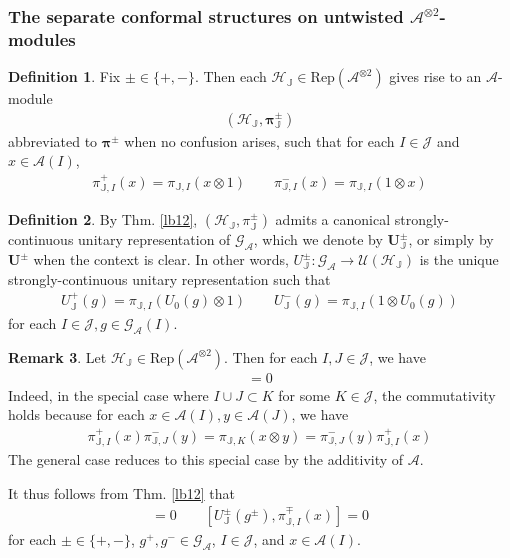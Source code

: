 \documentclass[11pt,b5paper,notitlepage]{article}
\theoremstyle{definition}
\newtheorem{df}{Definition}[section]
\newtheorem{rem}[df]{Remark}
\theoremstyle{plain}
\newcommand{\Rep}{\mathrm{Rep}}
\newcommand{\GA}{\mathscr G_{\mathcal A}}
\newcommand{\Jbb}{\mathbb J}
\newcommand{\MA}{\mathcal A}
\newcommand{\MH}{\mathcal H}
\newcommand{\MJ}{\mathcal J}
\newcommand{\MU}{\mathcal U}
\newcommand{\Maa}{{\mathcal A^{\otimes 2}}}
\newcommand{\hqed}{\hfill\qedsymbol}
\numberwithin{equation}{section}
\begin{document}
\subsubsection{The separate conformal structures on untwisted $\Maa$-modules}

\begin{df}\label{lb83}
Fix $\pm\in\{+,-\}$. Then each $\MH_\Jbb\in\Rep(\Maa)$ gives rise to an $\MA$-module
\begin{align*}
(\MH_\Jbb,\pmb{\pi^\pm_\Jbb})
\end{align*}
abbreviated to $\pmb{\pi^\pm}$ when no confusion arises, such that for each $I\in\MJ$ and $x\in\MA(I)$,
\begin{align*}
\pi_{\Jbb,I}^+(x)=\pi_{\Jbb,I}(x\otimes 1)\qquad \pi_{\Jbb,I}^-(x)=\pi_{\Jbb,I}(1\otimes x)
\end{align*}
\end{df}

\begin{df}\label{lb53}
By Thm. \ref{lb12}, $(\MH_\Jbb,\pi^\pm_\Jbb)$ admits a canonical strongly-continuous unitary representation of $\GA$, which we denote by $\pmb{U_\Jbb^\pm}$, or simply by $\pmb{U^\pm}$ when the context is clear. In other words, $U^\pm_\Jbb:\GA\rightarrow \MU(\MH_\Jbb)$ is the unique strongly-continuous unitary representation such that
\begin{gather}\label{eq23}
U^+_\Jbb(g)=\pi_{\Jbb,I}(U_0(g)\otimes 1)\qquad U^-_\Jbb(g)=\pi_{\Jbb,I}(1\otimes U_0(g))
\end{gather}
for each $I\in\MJ,g\in\GA(I)$.
\end{df}


\begin{rem}\label{lb104}
Let $\MH_\Jbb\in\Rep(\Maa)$. Then for each $I,J\in\MJ$, we have
\begin{align*}
[\pi^+_{\Jbb,I}(\MA(I)),\pi^-_{\Jbb,J}(\MA(J))]=0
\end{align*}
Indeed, in the special case where $I\cup J\subset K$ for some $K\in\MJ$, the commutativity holds because for each $x\in\MA(I),y\in\MA(J)$, we have
\begin{align*}
\pi^+_{\Jbb,I}(x)\pi^-_{\Jbb,J}(y)=\pi_{\Jbb,K}(x\otimes y)=\pi^-_{\Jbb,J}(y)\pi^+_{\Jbb,I}(x)
\end{align*}
The general case reduces to this special case by the additivity of $\MA$.

It thus follows from Thm. \ref{lb12} that
\begin{align*}
[U_\Jbb^+(g^+),U_\Jbb^-(g^-)]=0\qquad [U_\Jbb^\pm(g^\pm),\pi^\mp_{\Jbb,I}(x)]=0
\end{align*}
for each $\pm\in\{+,-\}$, $g^+,g^-\in\GA$, $I\in\MJ$, and $x\in\MA(I)$.   \hqed
\end{rem}
\end{document}
